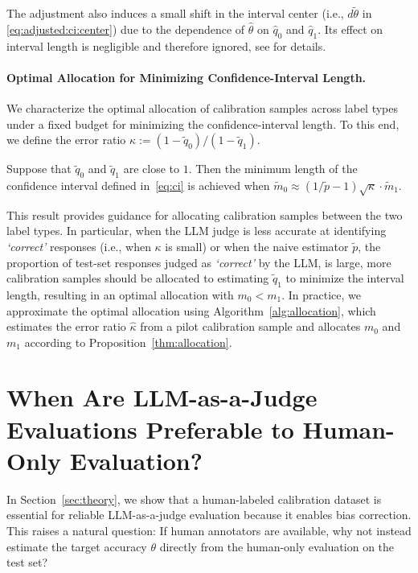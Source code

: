 The adjustment also induces a small shift in the interval center (i.e., $d\tilde{\theta}$ in \eqref{eq:adjusted:ci:center}) due to the dependence of $\hat{\theta}$ on $\hat{q}_0$ and $\hat{q}_1$.
Its effect on interval length is negligible and therefore ignored, see \citet{lang2014confidence} for details.

\paragraph{Optimal Allocation for Minimizing Confidence-Interval Length.}
We characterize the optimal allocation of calibration samples across label types under a fixed budget for minimizing the confidence-interval length. To this end, we define the error ratio $\kappa := (1-\tilde{q}_0)/(1-\tilde{q}_1)$.
\begin{proposition}
    \label{thm:allocation}
    Suppose that $\tilde{q}_0$ and $\tilde{q}_1$ are close to $1$.
    Then the minimum length of the confidence interval defined in~\eqref{eq:ci} is achieved when $\tilde{m}_0 \approx (1/\tilde{p}-1) \sqrt{\kappa} \cdot \tilde{m}_1$.
\end{proposition}
This result provides guidance for allocating calibration samples between the two label types. In particular, when the LLM judge is less accurate at identifying \emph{`correct'} responses (i.e., when $\kappa$ is small) or when the naive estimator $\tilde{p}$, the proportion of test-set responses judged as \emph{`correct'} by the LLM, is large, more calibration samples should be allocated to estimating $\tilde{q}_1$ to minimize the interval length, resulting in an optimal allocation with $m_0 < m_1$.
In practice, we approximate the optimal allocation using Algorithm~\ref{alg:allocation}, which estimates the error ratio $\hat{\kappa}$ from a pilot calibration sample and allocates $m_0$ and $m_1$ according to Proposition~\ref{thm:allocation}.


\section{When Are LLM-as-a-Judge Evaluations Preferable to Human-Only Evaluation?}
\label{sec:when-llm-judge}

In Section~\ref{sec:theory}, we show that a human-labeled calibration dataset is essential for reliable LLM-as-a-judge evaluation because it enables bias correction. This raises a natural question: If human annotators are available, why not instead estimate the target accuracy $\theta$ directly from the human-only evaluation on the test set?

